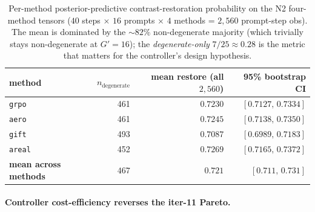 \begin{table}[t]
\centering
\caption{Per-method posterior-predictive contrast-restoration
probability on the N2 four-method tensors ($40$ steps $\times$
$16$ prompts $\times$ $4$ methods = $2{,}560$ prompt-step obs).
The mean is dominated by the $\sim 82\%$ non-degenerate majority
(which trivially stays non-degenerate at $G'{=}16$);
the \emph{degenerate-only} $7/25 \approx 0.28$ is the metric that
matters for the controller's design hypothesis.}
\label{tab:p7-postpred-mean}
\begin{tabular}{lrrr}
\toprule
method & $n_{\text{degenerate}}$ & mean restore (all $2{,}560$) & 95\% bootstrap CI \\
\midrule
\texttt{grpo}  & 461 & $0.7230$ & $[0.7127,\, 0.7334]$ \\
\texttt{aero}  & 461 & $0.7245$ & $[0.7138,\, 0.7350]$ \\
\texttt{gift}  & 493 & $0.7087$ & $[0.6989,\, 0.7183]$ \\
\texttt{areal} & 452 & $0.7269$ & $[0.7165,\, 0.7372]$ \\
\midrule
\textbf{mean across methods} & $467$ & $\mathbf{0.721}$ & $[0.711,\, 0.731]$ \\
\bottomrule
\end{tabular}
\end{table}

\paragraph{Controller cost-efficiency reverses the iter-11 Pareto.}

